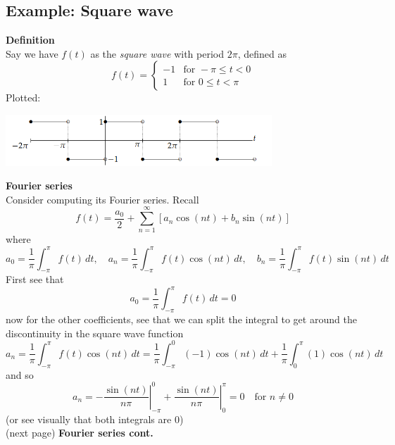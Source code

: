 \documentclass{report}
\begin{document}
\subsection{Example: Square wave}
\textbf{Definition}\\
Say we have $f(t)$ as the \textit{square wave} with period $2\pi$, defined as
\begin{equation*}
f(t)=\begin{cases}
-1&\text{for }-\pi\leq t<0\\
1&\text{for }0\leq t<\pi
\end{cases}
\end{equation*}
Plotted:
\begin{center}
\includegraphics[width=10cm]{36}\\
\end{center}
\textbf{Fourier series}\\
Consider computing its Fourier series. Recall
\begin{equation*}
f(t)=\frac{a_0}{2}+\sum^{\infty}_{n=1}[a_n\cos(nt)+b_n\sin(nt)]
\end{equation*}
where
\begin{equation*}
a_0=\frac{1}{\pi}\int^\pi_{-\pi}f(t)\,dt,\quad
a_n=\frac{1}{\pi}\int^\pi_{-\pi}f(t)\cos(nt)\,dt,\quad
b_n=\frac{1}{\pi}\int^\pi_{-\pi}f(t)\sin(nt)\,dt
\end{equation*}
First see that
\begin{equation*}
a_0=\frac{1}{\pi}\int^\pi_{-\pi}f(t)\,dt=0
\end{equation*}
now for the other coefficients, see that we can split the
integral to get around the discontinuity in the 
square wave function
\begin{equation*}
a_n=\frac{1}{\pi}\int^\pi_{-\pi}f(t)\cos(nt)\,dt
=\frac{1}{\pi}\int^0_{-\pi}(-1)\cos(nt)\,dt+\frac{1}{\pi}\int^\pi_{0}(1)\cos(nt)\,dt
\end{equation*}
and so
\begin{equation*}
a_n=\left.-\frac{\sin(nt)}{n\pi}\right|_{-\pi}^0+
\left.\frac{\sin(nt)}{n\pi}\right|^{\pi}_0=0\quad\text{for $n\neq0$}
\end{equation*}
(or see visually that both integrals are 0)\\
(next page)
\newpage
\noindent\textbf{Fourier series cont.}\\
\end{document}
